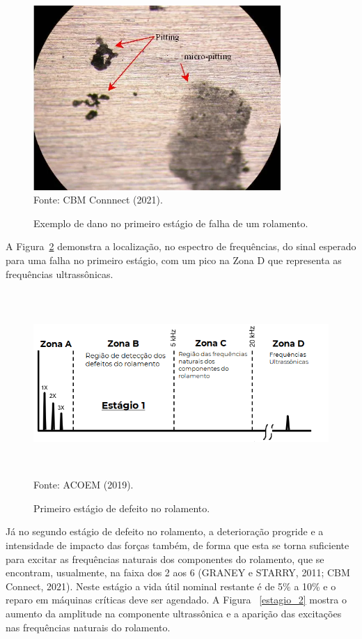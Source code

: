 \documentclass[
	12pt,				
	oneside,			
	a4paper,			
	english,			
	brazil,			
	]{abntex2ppgsi}
\begin{document}
\begin{figure}[H]
\centering
\caption {Exemplo de dano no primeiro estágio de falha de um rolamento.}
\includegraphics[width=\textwidth,height=70mm,keepaspectratio]{pitting_pista_externa} \\
Fonte: CBM Connnect (2021).
\label{pitting_pista_externa}
\end{figure}

A Figura~\ref{estagio_1} demonstra a localização, no espectro de frequências, do sinal esperado para uma falha no primeiro estágio, com um pico na Zona D que representa as frequências ultrassônicas.  

\begin{figure}[H]
\centering
\caption {Primeiro estágio de defeito no rolamento.}
\includegraphics[width=\textwidth,height=70mm,keepaspectratio]{estagio_1} \\
Fonte: ACOEM (2019).
\label{estagio_1}
\end{figure}

Já no segundo estágio de defeito no rolamento, a deterioração progride e a intensidade de impacto das forças também, de forma que esta se torna suficiente para excitar as frequências naturais dos componentes do rolamento, que se encontram, usualmente, na faixa dos \SI{2}{\kilo{\hertz}} aos \SI{6}{\kilo{\hertz}} (GRANEY e STARRY, 2011; CBM Connect, 2021). Neste estágio a vida útil nominal restante é de 5\% a 10\% e o reparo em máquinas críticas deve ser agendado. A Figura ~\ref{estagio_2} mostra o aumento da amplitude na componente ultrassônica e a aparição das excitações nas frequências naturais do rolamento. 
\end{document}

